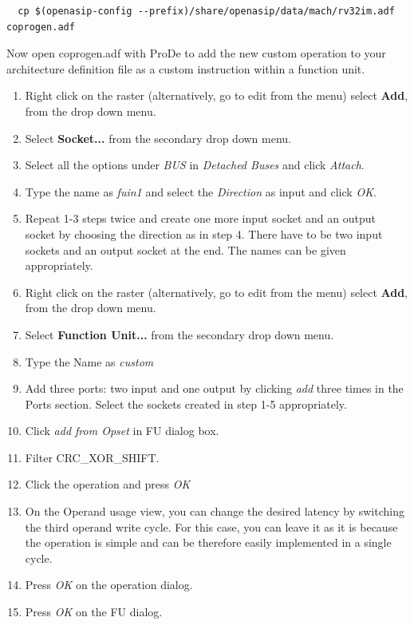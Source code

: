 \documentclass[a4paper,twoside]{tceusermanual}
\begin{document}
\begin{verbatim}
  cp $(openasip-config --prefix)/share/openasip/data/mach/rv32im.adf coprogen.adf
\end{verbatim}

Now open coprogen.adf with ProDe to add the new custom operation to your architecture 
definition file as a custom instruction within a function unit.


\begin{enumerate}
    
  \item%
    Right click on the raster (alternatively, go to edit from the menu) select \textbf{Add}, 
    from the drop down menu.
  \item%
    Select \textbf{Socket...} from the secondary drop down menu.
    \item%
    Select all the options under \textit{BUS} in \textit{Detached Buses} and click \emph{Attach}.
    \item%
    Type the name as \textit{fuin1} and select the \textit{Direction} as input and click \emph{OK}.
    \item%
    Repeat 1-3 steps twice and create one more input socket and an output socket by choosing 
    the direction as in step 4. There have to be two input sockets and an output socket at the end. 
    The names can be given appropriately.
  \item%
    Right click on the raster (alternatively, go to edit from the menu) select \textbf{Add}, from 
    the drop down menu.
  \item%
    Select \textbf{Function Unit...} from the secondary drop down menu.
  \item%
    Type the Name as \textit{custom}
  \item%
    Add three ports: two input and one output by clicking \textit{add} three times in the Ports 
    section. Select the sockets created in step 1-5 appropriately.
  \item%
    Click \emph{add from Opset} in FU dialog box.
  \item%
    Filter CRC\_XOR\_SHIFT.
  \item%
    Click the operation and press \emph{OK}
  \item%
    On the Operand usage view, you can change the desired latency by switching
    the third operand write cycle. For this case, you can leave it as it is because
    the operation is simple and can be therefore easily implemented in a single cycle.
  \item%
    Press \emph{OK} on the operation dialog.
  \item%
    Press \emph{OK} on the FU dialog.
\end{enumerate}
\end{document}
